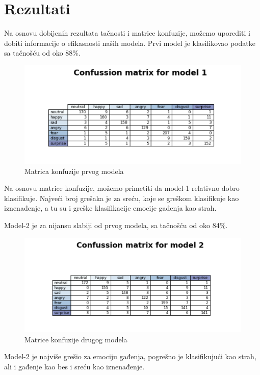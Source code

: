\documentclass{article}
\begin{document}
\newpage
\section {Rezultati}
Na osnovu dobijenih rezultata tačnosti i matrice konfuzije, možemo uporediti i dobiti informacije o efikasnosti naših modela.  
Prvi model je klasifikovao podatke sa tačnošću od oko 88\%. 

\begin{figure}[h]
\centering
\includegraphics[scale=0.8]{matrix1.png}
\caption{Matrica konfuzije prvog modela}
\end{figure}

Na osnovu matrice konfuzije, možemo primetiti da model-1 relativno dobro klasifikuje. Najveći broj grešaka je za sreću, koje se greškom klasifikuje kao iznenađenje, a tu su i greške klasifikacije emocije gađenja kao strah.

Model-2 je za nijansu slabiji od prvog modela, sa tačnošću od oko 84\%.

\begin{figure}[ht]
\centering
\includegraphics[scale=0.8]{matrix2.png}
\caption{Matrice konfuzije drugog modela}
\end{figure}
\newpage
Model-2 je najviše grešio za emociju gađenja, pogrešno je klasifikujući kao strah, ali i gađenje kao bes  i sreću kao iznenađenje.
\end{document}
